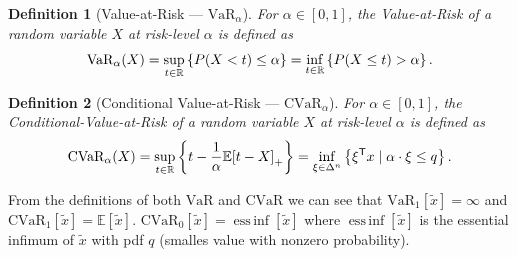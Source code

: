 \documentclass[10pt]{article}
\newtheorem{definition}{Definition}
\newcommand{\cvar}{\text{CVaR}}
\newcommand{\cvaralpha}{\text{CVaR}_\alpha}
\newcommand{\var}{\text{VaR}}
\newcommand{\varalpha}{\text{VaR}_\alpha}
\theoremstyle{plain}
\theoremstyle{remark}
\DeclareMathOperator*{\essinf}{ess\,inf}
\begin{document}
\begin{definition}[Value-at-Risk --- $\varalpha$]\label{def:var}
        For $\alpha \in [0, 1]$, the Value-at-Risk of a random variable 
        $X$ at risk-level $\alpha$ is defined as
        \[
                \varalpha(X) = \sup_{t \in \Real} \left\{ P(X < t) \leq \alpha \right\} = \inf_{t \in \Real} \left\{ P(X \leq t) > \alpha \right\}.
        \]
\end{definition}

\begin{definition}[Conditional Value-at-Risk --- $\cvaralpha$]\label{def:cvar}
        For $\alpha \in [0, 1]$, the Conditional-Value-at-Risk of a random variable 
        $X$ at risk-level $\alpha$ is defined as
        \[
                \cvaralpha(X) = \sup_{t \in \Real} \left\{ t - \frac{1}{\alpha} \mathbb{E}{[t - X]}_+ \right\} =
                \inf_{\xi \in \Delta^n} \left\{ \xi\tr x \mid \alpha \cdot \xi \leq q \right\}.
        \]
\end{definition}

From the definitions of both $\var$ and $\cvar$ we can see that $\var_1[\tilde{x}] = \infty$ and $\cvar_1[\tilde{x}] = \mathbb{E}[\tilde{x}]$.
$\cvar_0[\tilde{x}] = \essinf[\tilde{x}]$ where $\essinf[\tilde{x}]$ is the essential infimum of $\tilde{x}$ with pdf
$q$ (smalles value with nonzero probability).
\end{document}
